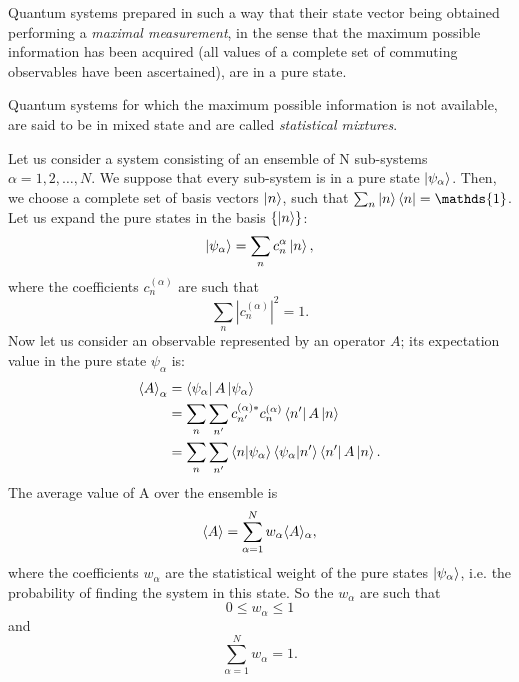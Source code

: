 Quantum systems prepared in such a way that their state vector being obtained performing a \emph{maximal measurement}, in the sense that the maximum possible information has been acquired (all values of a complete set of commuting observables have been ascertained), are in a pure state. 

Quantum systems for which the maximum possible information is not available, are said to be in mixed state and are called \emph{statistical mixtures}.

Let us consider a system consisting of an ensemble of N sub-systems $\alpha = 1, 2, \dots , N$. We suppose that every sub-system is in a pure state $\ket{\psi_\alpha}$. Then, we choose a complete set of basis vectors $\ket{n}$, such that $\sum_n \ket{n}\bra{n} = \mathds{1}$. Let us expand the pure states in the basis $\{\ket{n}\}$:
\begin{equation*}
    \ket{\psi_\alpha} = \sum_n c_n^{\alpha}\ket{n},
\end{equation*}
where the coefficients $c_n^{(\alpha)}$ are such that
\begin{equation*}
    \sum_n |c_n^{(\alpha)}|^2 = 1.
\end{equation*}
Now let us consider an observable represented by an operator $A$; its expectation value in the pure state $\psi_\alpha$ is:
\begin{align}
    \braket{A}_\alpha &= \bra{\psi_\alpha}A\ket{\psi_\alpha} \\
                      \label{braket_A}
                      &= \sum_n \sum_{n'} c_{n'}^{(\alpha)*} c_n^{(\alpha)} \bra{n'}A\ket{n} \\
                      &= \sum_n \sum_{n'} \braket{n|\psi_\alpha}\braket{\psi_\alpha|n'} \bra{n'}A\ket{n}.
\end{align}
The average value of A over the ensemble is
\begin{equation}
\label{stat_averageA}
    \braket{A} = \sum_{\alpha = 1}^N w_\alpha \langle A \rangle_\alpha,
\end{equation}
where the coefficients $w_\alpha$ are the statistical weight of the pure states $\ket{\psi_\alpha}$, i.e. the probability of finding the system in this state. 
So the $w_\alpha$ are such that
\begin{equation}
\label{charact_weights}
    0 \leq w_\alpha \leq 1
\end{equation}
and 
\begin{equation*}
    \sum_{\alpha=1}^N w_\alpha = 1.
\end{equation*}

